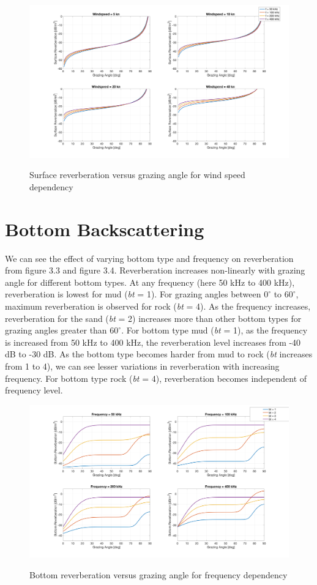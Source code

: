 \begin{figure}[H]
\centering
{\includegraphics[scale=0.18]{usp3_2.png}}
\caption{Surface reverberation versus grazing angle for wind speed dependency}
\end{figure}

\newpage

\section{ Bottom Backscattering } \label{ Bottom Backscattering } 
\noindent We can see the effect of varying bottom type and frequency on reverberation from figure 3.3 and figure 3.4. Reverberation increases non-linearly with grazing angle for different bottom types. At any frequency (here 50 kHz to 400 kHz), reverberation is lowest for mud (\textit{bt} = 1). For grazing angles between $0^{\circ}$ to $60^{\circ}$, maximum reverberation is observed for rock (\textit{bt} = 4). As the frequency increases, reverberation for the sand (\textit{bt} = 2) increases more than other bottom types for grazing angles greater than $60^{\circ}$. For bottom type mud (\textit{bt} = 1), as the frequency is increased from 50 kHz to 400 kHz, the reverberation level increases from -40 dB to -30 dB. As the bottom type becomes harder from mud to rock (\textit{bt} increases from 1 to 4), we can see lesser variations in reverberation with increasing frequency. For bottom type rock (\textit{bt} = 4), reverberation becomes independent of frequency level. 

\begin{figure}[H]
\centering
{\includegraphics[scale=0.18]{usp3_3.png}}
\caption{Bottom reverberation versus grazing angle for frequency dependency}
\end{figure}

